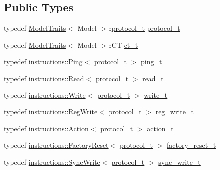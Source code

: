 \subsection*{Public Types}
\begin{DoxyCompactItemize}
\item 
typedef \hyperlink{structdynamixel_1_1servos_1_1_model_traits}{Model\+Traits}$<$ Model $>$\+::\hyperlink{classdynamixel_1_1servos_1_1_servo_a7718c41cee1187b992836f4b6bad8a38}{protocol\+\_\+t} \hyperlink{classdynamixel_1_1servos_1_1_servo_a7718c41cee1187b992836f4b6bad8a38}{protocol\+\_\+t}
\item 
typedef \hyperlink{structdynamixel_1_1servos_1_1_model_traits}{Model\+Traits}$<$ Model $>$\+::CT \hyperlink{classdynamixel_1_1servos_1_1_servo_a882738edc68b4e641e066954f59896d3}{ct\+\_\+t}
\item 
typedef \hyperlink{classdynamixel_1_1instructions_1_1_ping}{instructions\+::\+Ping}$<$ \hyperlink{classdynamixel_1_1servos_1_1_servo_a7718c41cee1187b992836f4b6bad8a38}{protocol\+\_\+t} $>$ \hyperlink{classdynamixel_1_1servos_1_1_servo_ae6ffa69927b65a1b73a52e80bcd07859}{ping\+\_\+t}
\item 
typedef \hyperlink{classdynamixel_1_1instructions_1_1_read}{instructions\+::\+Read}$<$ \hyperlink{classdynamixel_1_1servos_1_1_servo_a7718c41cee1187b992836f4b6bad8a38}{protocol\+\_\+t} $>$ \hyperlink{classdynamixel_1_1servos_1_1_servo_a456a730b825adc0b7b295f567cf2947b}{read\+\_\+t}
\item 
typedef \hyperlink{classdynamixel_1_1instructions_1_1_write}{instructions\+::\+Write}$<$ \hyperlink{classdynamixel_1_1servos_1_1_servo_a7718c41cee1187b992836f4b6bad8a38}{protocol\+\_\+t} $>$ \hyperlink{classdynamixel_1_1servos_1_1_servo_a4d005c64809a7c1ddf3817ca55ef03c2}{write\+\_\+t}
\item 
typedef \hyperlink{classdynamixel_1_1instructions_1_1_reg_write}{instructions\+::\+Reg\+Write}$<$ \hyperlink{classdynamixel_1_1servos_1_1_servo_a7718c41cee1187b992836f4b6bad8a38}{protocol\+\_\+t} $>$ \hyperlink{classdynamixel_1_1servos_1_1_servo_adb8219ecc5a368a3222cf30cd17bb882}{reg\+\_\+write\+\_\+t}
\item 
typedef \hyperlink{classdynamixel_1_1instructions_1_1_action}{instructions\+::\+Action}$<$ \hyperlink{classdynamixel_1_1servos_1_1_servo_a7718c41cee1187b992836f4b6bad8a38}{protocol\+\_\+t} $>$ \hyperlink{classdynamixel_1_1servos_1_1_servo_ad4d14ab8f1ea33479dce5fc2c7790ded}{action\+\_\+t}
\item 
typedef \hyperlink{classdynamixel_1_1instructions_1_1_factory_reset}{instructions\+::\+Factory\+Reset}$<$ \hyperlink{classdynamixel_1_1servos_1_1_servo_a7718c41cee1187b992836f4b6bad8a38}{protocol\+\_\+t} $>$ \hyperlink{classdynamixel_1_1servos_1_1_servo_abbf04a51c076bfbf234179bb59fd45a2}{factory\+\_\+reset\+\_\+t}
\item 
typedef \hyperlink{classdynamixel_1_1instructions_1_1_sync_write}{instructions\+::\+Sync\+Write}$<$ \hyperlink{classdynamixel_1_1servos_1_1_servo_a7718c41cee1187b992836f4b6bad8a38}{protocol\+\_\+t} $>$ \hyperlink{classdynamixel_1_1servos_1_1_servo_aba1cb665a7f6abd9ba15f10f9264d9c8}{sync\+\_\+write\+\_\+t}
\end{DoxyCompactItemize}
